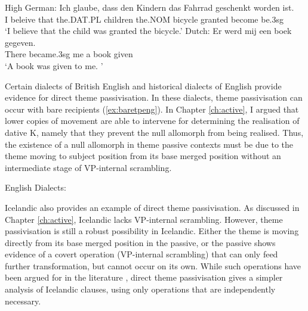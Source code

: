 {\begin{exe}
\ex High German:
\gll Ich glaube, dass den Kindern das Fahrrad geschenkt worden ist.\\
I beleive that the.DAT.PL children the.NOM bicycle granted become be.3sg\\
\trans `I believe that the child was granted the bicycle.'
\ex Dutch:
\gll Er werd mij een boek gegeven.\\
There became.3sg me a book given\\
\trans `A book was given to me. \cite[pg 245]{Donaldson.2008}'
\end{exe}

Certain dialects of British English and historical dialects of English provide evidence for direct theme passivisation. In these dialects, theme passivisation can occur with bare recipients (\ref{ex:baretpeng}). In Chapter \ref{ch:active}, I argued that lower copies of movement are able to intervene for determining the realisation of dative K, namely that they prevent the null allomorph from being realised. Thus, the existence of a null allomorph in theme passive contexts must be due to the theme moving to subject position from its base merged position without an intermediate stage of VP-internal scrambling.

\begin{exe}
	\ex English Dialects: 
		\begin{xlist}
		\end{xlist}
\end{exe}

Icelandic also provides an example of direct theme passivisation. As discussed in Chapter \ref{ch:active}, Icelandic lacks VP-internal scrambling. However, theme passivisation is still a robust possibility in Icelandic. Either the theme is moving directly from its base merged position in the passive, or the passive shows evidence of a covert operation (VP-internal scrambling) that can only feed further transformation, but cannot occur on its own. While such operations have been argued for in the literature \citep[119ff]{Richards.2001}, direct theme passivisation gives a simpler analysis of Icelandic clauses, using only operations that are independently necessary.

}
